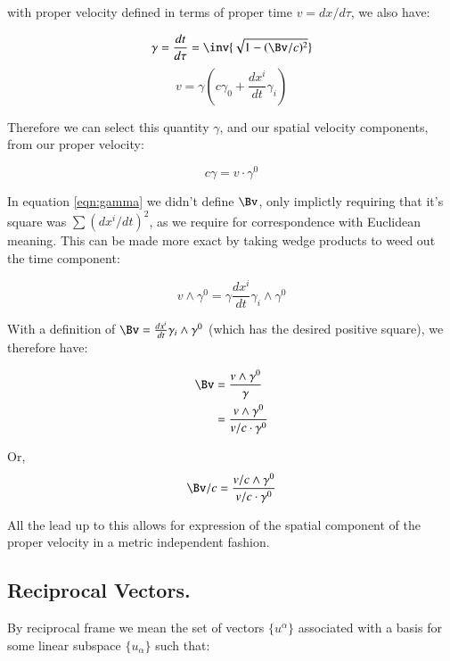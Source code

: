 \documentclass{article}
\begin{document}
with proper velocity defined in terms of proper time $v = dx/d\tau$, we also have:

\begin{equation}\label{eqn:gamma}
\gamma = \frac{dt}{d\tau} = \inv{ \sqrt{ 1 - (\Bv/c)^2 } }
\end{equation}
\begin{equation}
v = \gamma \left(c \gamma_0 + \frac{d x^i }{d t} \gamma_i \right)
\end{equation}

Therefore we can select this quantity $\gamma$, and our spatial velocity components, from our proper velocity:

\begin{equation*}
c \gamma = v \cdot \gamma^0
\end{equation*}

In equation \ref{eqn:gamma} we didn't define $\Bv$, only implictly requiring that it's square was $\sum (dx^i/dt)^2$, as we require for correspondence with Euclidean meaning.  This can be made more exact by
taking wedge products to weed out the time component:

\begin{equation*}
v \wedge \gamma^0 = \gamma \frac{d x^i }{d t} \gamma_i \wedge \gamma^0
\end{equation*}

With a definition of $\Bv = \frac{d x^i }{d t} \gamma_i \wedge \gamma^0$ (which has the desired positive square), we therefore have:

\begin{align*}
\Bv
&= \frac{v \wedge \gamma^0 }{\gamma} \\
&= \frac{v \wedge \gamma^0 }{ v/c \cdot \gamma^0 } \\
\end{align*}

Or,
\begin{equation}
\Bv/c = \frac{v/c \wedge \gamma^0 }{ v/c \cdot \gamma^0 }
\end{equation}

All the lead up to this allows for expression of the spatial component of the proper velocity in a metric independent fashion.

\subsection{ Reciprocal Vectors. }

By reciprocal frame we mean the set of vectors $\{u^{\alpha}\}$ associated with a basis
for some linear subspace $\{u_{\alpha}\}$ such that:
\end{document}
